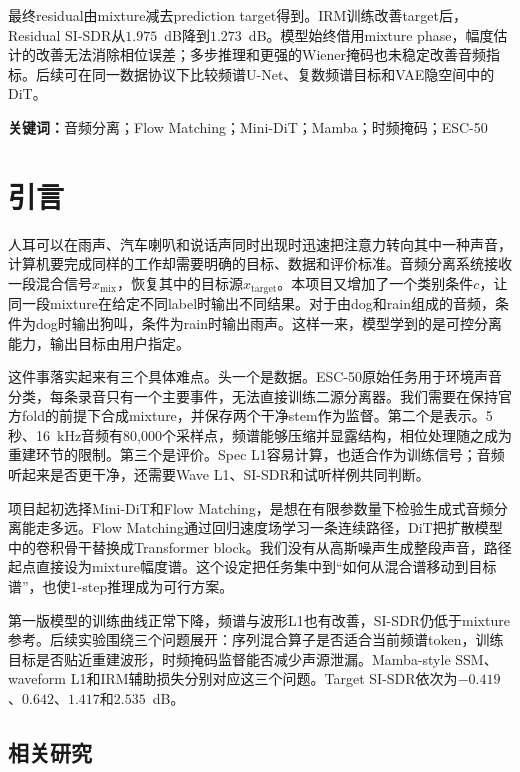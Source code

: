 \documentclass[UTF8,12pt,a4paper]{ctexart}
\begin{document}
最终residual由mixture减去prediction target得到。IRM训练改善target后，Residual SI-SDR从$1.975$~dB降到$1.273$~dB。模型始终借用mixture phase，幅度估计的改善无法消除相位误差；多步推理和更强的Wiener掩码也未稳定改善音频指标。后续可在同一数据协议下比较频谱U-Net、复数频谱目标和VAE隐空间中的DiT。

\vspace{0.8em}
\noindent\textbf{关键词：}音频分离；Flow Matching；Mini-DiT；Mamba；时频掩码；ESC-50

\clearpage
\thispagestyle{empty}
\tableofcontents

\clearpage
{}

\section{引言}

人耳可以在雨声、汽车喇叭和说话声同时出现时迅速把注意力转向其中一种声音，计算机要完成同样的工作却需要明确的目标、数据和评价标准。音频分离系统接收一段混合信号$x_{\mathrm{mix}}$，恢复其中的目标源$x_{\mathrm{target}}$。本项目又增加了一个类别条件$c$，让同一段mixture在给定不同label时输出不同结果。对于由dog和rain组成的音频，条件为dog时输出狗叫，条件为rain时输出雨声。这样一来，模型学到的是可控分离能力，输出目标由用户指定。

这件事落实起来有三个具体难点。头一个是数据。ESC-50原始任务用于环境声音分类，每条录音只有一个主要事件，无法直接训练二源分离器。我们需要在保持官方fold的前提下合成mixture，并保存两个干净stem作为监督。第二个是表示。5秒、16~kHz音频有80,000个采样点，频谱能够压缩并显露结构，相位处理随之成为重建环节的限制。第三个是评价。Spec L1容易计算，也适合作为训练信号；音频听起来是否更干净，还需要Wave L1、SI-SDR和试听样例共同判断。

项目起初选择Mini-DiT和Flow Matching，是想在有限参数量下检验生成式音频分离能走多远。Flow Matching通过回归速度场学习一条连续路径\cite{lipman2023flow}，DiT把扩散模型中的卷积骨干替换成Transformer block\cite{peebles2023dit}。我们没有从高斯噪声生成整段声音，路径起点直接设为mixture幅度谱。这个设定把任务集中到“如何从混合谱移动到目标谱”，也使1-step推理成为可行方案。

第一版模型的训练曲线正常下降，频谱与波形L1也有改善，SI-SDR仍低于mixture参考。后续实验围绕三个问题展开：序列混合算子是否适合当前频谱token，训练目标是否贴近重建波形，时频掩码监督能否减少声源泄漏。Mamba-style SSM、waveform L1和IRM辅助损失分别对应这三个问题。Target SI-SDR依次为$-0.419$、$0.642$、$1.417$和$2.535$~dB。

\subsection{相关研究}
\end{document}
